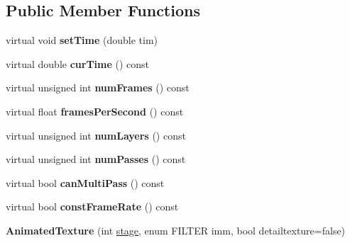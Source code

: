 \subsection*{Public Member Functions}
\begin{DoxyCompactItemize}
\item 
virtual void {\bfseries set\+Time} (double tim)\hypertarget{classAnimatedTexture_a558ce2245ecf8fc5463a8298420b8c8c}{}\label{classAnimatedTexture_a558ce2245ecf8fc5463a8298420b8c8c}

\item 
virtual double {\bfseries cur\+Time} () const \hypertarget{classAnimatedTexture_a6c2d647576a5f4c059f3dc6d1f8a870e}{}\label{classAnimatedTexture_a6c2d647576a5f4c059f3dc6d1f8a870e}

\item 
virtual unsigned int {\bfseries num\+Frames} () const \hypertarget{classAnimatedTexture_ac4f3e26cb52fb042f59009b24568a4be}{}\label{classAnimatedTexture_ac4f3e26cb52fb042f59009b24568a4be}

\item 
virtual float {\bfseries frames\+Per\+Second} () const \hypertarget{classAnimatedTexture_a28bb6af6c208b95232f0654ccbab7a82}{}\label{classAnimatedTexture_a28bb6af6c208b95232f0654ccbab7a82}

\item 
virtual unsigned int {\bfseries num\+Layers} () const \hypertarget{classAnimatedTexture_af7b0216ac1c15db825341dd5f28e9966}{}\label{classAnimatedTexture_af7b0216ac1c15db825341dd5f28e9966}

\item 
virtual unsigned int {\bfseries num\+Passes} () const \hypertarget{classAnimatedTexture_a98660b168299099ce75d7573b7b7f7af}{}\label{classAnimatedTexture_a98660b168299099ce75d7573b7b7f7af}

\item 
virtual bool {\bfseries can\+Multi\+Pass} () const \hypertarget{classAnimatedTexture_a4d87874e7689db3d59a869fa79ab7b25}{}\label{classAnimatedTexture_a4d87874e7689db3d59a869fa79ab7b25}

\item 
virtual bool {\bfseries const\+Frame\+Rate} () const \hypertarget{classAnimatedTexture_af6f526ff5b55694cac785a5a5ae8086d}{}\label{classAnimatedTexture_af6f526ff5b55694cac785a5a5ae8086d}

\item 
{\bfseries Animated\+Texture} (int \hyperlink{classTexture_aa38999434f9fcf409ca20b4523852b7b}{stage}, enum F\+I\+L\+T\+ER imm, bool detailtexture=false)\hypertarget{classAnimatedTexture_a845be43d145fa8e2d5a08d2a7de9a48c}{}\label{classAnimatedTexture_a845be43d145fa8e2d5a08d2a7de9a48c}


\end{DoxyCompactItemize}
